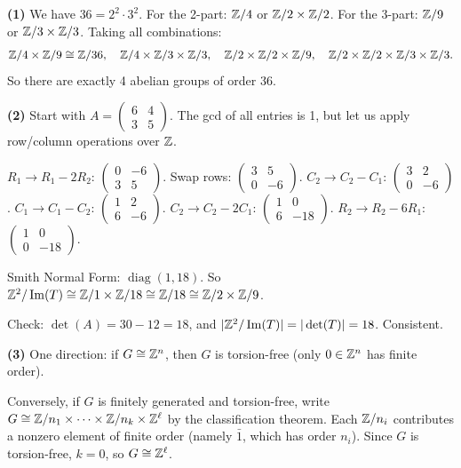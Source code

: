 \documentclass{report}
\begin{document}
\begin{solution}
\textbf{(1)} We have \(36 = 2^2 \cdot 3^2\). For the 2-part: \(\ZZ/4\) or \(\ZZ/2 \times \ZZ/2\). For the 3-part: \(\ZZ/9\) or \(\ZZ/3 \times \ZZ/3\). Taking all combinations:
\[\ZZ/4 \times \ZZ/9 \cong \ZZ/36, \quad \ZZ/4 \times \ZZ/3 \times \ZZ/3, \quad \ZZ/2 \times \ZZ/2 \times \ZZ/9, \quad \ZZ/2 \times \ZZ/2 \times \ZZ/3 \times \ZZ/3.\]
So there are exactly 4 abelian groups of order 36.

\textbf{(2)} Start with \(A = \begin{pmatrix} 6 & 4 \\ 3 & 5 \end{pmatrix}\). The gcd of all entries is 1, but let us apply row/column operations over \(\ZZ\).

\(R_1 \to R_1 - 2R_2\): \(\begin{pmatrix} 0 & -6 \\ 3 & 5 \end{pmatrix}\). Swap rows: \(\begin{pmatrix} 3 & 5 \\ 0 & -6 \end{pmatrix}\). \(C_2 \to C_2 - C_1\): \(\begin{pmatrix} 3 & 2 \\ 0 & -6 \end{pmatrix}\). \(C_1 \to C_1 - C_2\): \(\begin{pmatrix} 1 & 2 \\ 6 & -6 \end{pmatrix}\). \(C_2 \to C_2 - 2C_1\): \(\begin{pmatrix} 1 & 0 \\ 6 & -18 \end{pmatrix}\). \(R_2 \to R_2 - 6R_1\): \(\begin{pmatrix} 1 & 0 \\ 0 & -18 \end{pmatrix}\).

Smith Normal Form: \(\operatorname{diag}(1, 18)\). So \(\ZZ^2 / \Img(T) \cong \ZZ/1 \times \ZZ/18 \cong \ZZ/18 \cong \ZZ/2 \times \ZZ/9\).

Check: \(\det(A) = 30 - 12 = 18\), and \(|\ZZ^2 / \Img(T)| = |\det(T)| = 18\). Consistent.

\textbf{(3)} One direction: if \(G \cong \ZZ^n\), then \(G\) is torsion-free (only \(0 \in \ZZ^n\) has finite order).

Conversely, if \(G\) is finitely generated and torsion-free, write \(G \cong \ZZ/n_1 \times \cdots \times \ZZ/n_k \times \ZZ^\ell\) by the classification theorem. Each \(\ZZ/n_i\) contributes a nonzero element of finite order (namely \(\bar{1}\), which has order \(n_i\)). Since \(G\) is torsion-free, \(k = 0\), so \(G \cong \ZZ^\ell\).


\end{solution}
\end{document}

